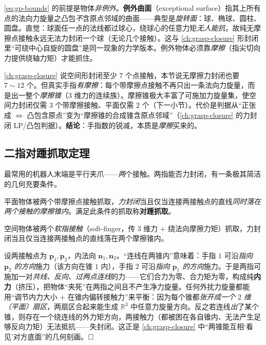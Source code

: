 \begin{note}
\cref{eq:gp-bounds} 的前提是物体\emph{非例外}。\textbf{例外曲面}（exceptional surface）指其上所有点的法向力旋量之凸包\emph{不}含原点邻域的曲面——典型是\emph{旋转面}：球、椭球、圆柱、圆盘。直觉：球面任一点的法线都过球心，绕球心的任意力矩\emph{无人能抗}，故纯无摩擦点接触永远无法力封闭一个球（无论几个接触）。这与 \cref{ch:grasp-closure} 形封闭里“可绕中心自旋的圆盘”是同一现象的力学版本。例外物体必须靠\emph{摩擦}（指尖切向力提供绕轴力矩）才能抓住。
\end{note}

\begin{insight}[摩擦把“$7$ 个”降到“$3$ 个”]
\cref{ch:grasp-closure} 说空间形封闭至少 $7$ 个点接触，本节说无摩擦力封闭也要 $7\sim 12$ 个。但真实手指\emph{有摩擦}：每个带摩擦点接触不再只出一条法向力旋量，而是出一整个\emph{摩擦锥}（$3$ 维力的连续族）。摩擦锥极大丰富了可施加力旋量集，使空间力封闭仅需 $3$ 个带摩擦接触、平面仅需 $2$ 个（下一小节）。代价是判据从“正张成 $\iff$ 凸包含原点”变为“摩擦锥的合成锥含原点邻域”（\cref{ch:grasp-closure} 的力封闭 LP/凸包判据）。\textbf{结论}：手指数的锐减，本质是\emph{摩擦}买来的。
\end{insight}

\subsection{二指对踵抓取定理}
最常用的机器人末端是平行夹爪——\emph{两}个接触。两指能否力封闭，有一条极其简洁的几何充要条件。

\begin{theorem}\label{thm:gp-antipodal}
平面物体被两个带摩擦点接触抓取，\emph{力封闭}当且仅当连接两接触点的直线\emph{同时落在两个接触的摩擦锥内}。满足此条件的抓取称\textbf{对踵抓取}。
\end{theorem}

\begin{proposition}\label{prop:gp-antipodal-spatial}
空间物体被两个\emph{软指接触}（soft-finger，传 $3$ 维力 $+$ 绕法向摩擦力矩）抓取，力封闭当且仅当连接两接触点的直线落在两个摩擦锥内。
\end{proposition}

\begin{derivation}[对踵条件的几何直觉]
设两接触点为 $\mathbf{p}_1,\mathbf{p}_2$，内法向 $\mathbf{n}_1,\mathbf{n}_2$。“连线在两锥内”意味着：手指 $1$ 可沿\emph{指向 $\mathbf{p}_2$ 的方向}施力（该方向在锥 $1$ 内），手指 $2$ 可沿\emph{指向 $\mathbf{p}_1$ 的方向}施力。于是两指可施加一对\emph{共线、反向、过两点连线}的力——它们合力为零、合力矩为零，构成纯\textbf{内力}（挤压），把物体“夹死”在两指之间且不产生净力旋量。任何外扰力旋量都能用“调节内力大小 $+$ 在锥内偏转接触力”来平衡：因为每个锥都\emph{张开成一个 $2$ 维（平面）扇区}，两扇区合起来能生成 $\mathbb{R}^3$ 中任意力旋量方向。反之若连线\emph{出}了某个锥，则存在一个绕连线的外力矩方向，两接触力（都被困在各自锥内、无法产生足够反向力矩）无法抵抗——失封闭。这正是 \cref{ch:grasp-closure} 中“两锥能互相‘看见’对方底面”的几何刻画。$\hfill\square$
\end{derivation}

